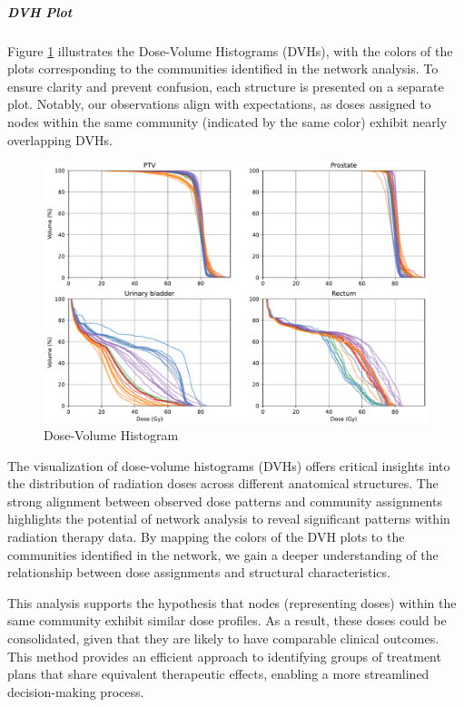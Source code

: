 \subparagraph{DVH Plot}
Figure \ref{fig:dvh} illustrates the Dose-Volume Histograms (DVHs), with the colors of the plots corresponding to the communities identified in the network analysis.
To ensure clarity and prevent confusion, each structure is presented on a separate plot.
Notably, our observations align with expectations, as doses assigned to nodes within the same community (indicated by the same color) exhibit nearly overlapping DVHs.
\begin{figure}
	\centering
	\includegraphics[width=\textwidth]{dose_clustering_figures/dvh.pdf}
	\caption{Dose-Volume Histogram}
	\label{fig:dvh}
\end{figure}

The visualization of dose-volume histograms (DVHs) offers critical insights into the distribution of radiation doses across different anatomical structures.
The strong alignment between observed dose patterns and community assignments highlights the potential of network analysis to reveal significant patterns within radiation therapy data.
By mapping the colors of the DVH plots to the communities identified in the network, we gain a deeper understanding of the relationship between dose assignments and structural characteristics.

This analysis supports the hypothesis that nodes (representing doses) within the same community exhibit similar dose profiles.
As a result, these doses could be consolidated, given that they are likely to have comparable clinical outcomes.
This method provides an efficient approach to identifying groups of treatment plans that share equivalent therapeutic effects, enabling a more streamlined decision-making process.

